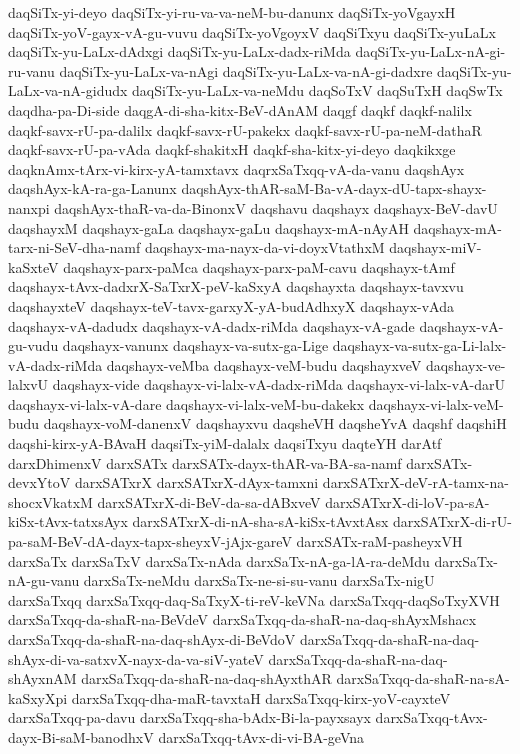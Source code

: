 {daqSiTx-yi-deyo
daqSiTx-yi-ru-va-va-neM-bu-danunx
daqSiTx-yoVgayxH
daqSiTx-yoV-gayx-vA-gu-vuvu
daqSiTx-yoVgoyxV
daqSiTxyu
daqSiTx-yuLaLx
daqSiTx-yu-LaLx-dAdxgi
daqSiTx-yu-LaLx-dadx-riMda
daqSiTx-yu-LaLx-nA-gi-ru-vanu
daqSiTx-yu-LaLx-va-nAgi
daqSiTx-yu-LaLx-va-nA-gi-dadxre
daqSiTx-yu-LaLx-va-nA-gidudx
daqSiTx-yu-LaLx-va-neMdu
daqSoTxV
daqSuTxH
daqSwTx
daqdha-pa-Di-side
daqgA-di-sha-kitx-BeV-dAnAM
daqgf
daqkf
daqkf-nalilx
daqkf-savx-rU-pa-dalilx
daqkf-savx-rU-pakekx
daqkf-savx-rU-pa-neM-dathaR
daqkf-savx-rU-pa-vAda
daqkf-shakitxH
daqkf-sha-kitx-yi-deyo
daqkikxge
daqknAmx-tArx-vi-kirx-yA-tamxtavx
daqrxSaTxqq-vA-da-vanu
daqshAyx
daqshAyx-kA-ra-ga-Lanunx
daqshAyx-thAR-saM-Ba-vA-dayx-dU-tapx-shayx-nanxpi
daqshAyx-thaR-va-da-BinonxV
daqshavu
daqshayx
daqshayx-BeV-davU
daqshayxM
daqshayx-gaLa
daqshayx-gaLu
daqshayx-mA-nAyAH
daqshayx-mA-tarx-ni-SeV-dha-namf
daqshayx-ma-nayx-da-vi-doyxVtathxM
daqshayx-miV-kaSxteV
daqshayx-parx-paMca
daqshayx-parx-paM-cavu
daqshayx-tAmf
daqshayx-tAvx-dadxrX-SaTxrX-peV-kaSxyA
daqshayxta
daqshayx-tavxvu
daqshayxteV
daqshayx-teV-tavx-garxyX-yA-budAdhxyX
daqshayx-vAda
daqshayx-vA-dadudx
daqshayx-vA-dadx-riMda
daqshayx-vA-gade
daqshayx-vA-gu-vudu
daqshayx-vanunx
daqshayx-va-sutx-ga-Lige
daqshayx-va-sutx-ga-Li-lalx-vA-dadx-riMda
daqshayx-veMba
daqshayx-veM-budu
daqshayxveV
daqshayx-ve-lalxvU
daqshayx-vide
daqshayx-vi-lalx-vA-dadx-riMda
daqshayx-vi-lalx-vA-darU
daqshayx-vi-lalx-vA-dare
daqshayx-vi-lalx-veM-bu-dakekx
daqshayx-vi-lalx-veM-budu
daqshayx-voM-danenxV
daqshayxvu
daqsheVH
daqsheYvA
daqshf
daqshiH
daqshi-kirx-yA-BAvaH
daqsiTx-yiM-dalalx
daqsiTxyu
daqteYH
darAtf
darxDhimenxV
darxSATx
darxSATx-dayx-thAR-va-BA-sa-namf
darxSATx-devxYtoV
darxSATxrX
darxSATxrX-dAyx-tamxni
darxSATxrX-deV-rA-tamx-na-shocxVkatxM
darxSATxrX-di-BeV-da-sa-dABxveV
darxSATxrX-di-loV-pa-sA-kiSx-tAvx-tatxsAyx
darxSATxrX-di-nA-sha-sA-kiSx-tAvxtAsx
darxSATxrX-di-rU-pa-saM-BeV-dA-dayx-tapx-sheyxV-jAjx-gareV
darxSATx-raM-pasheyxVH
darxSaTx
darxSaTxV
darxSaTx-nAda
darxSaTx-nA-ga-lA-ra-deMdu
darxSaTx-nA-gu-vanu
darxSaTx-neMdu
darxSaTx-ne-si-su-vanu
darxSaTx-nigU
darxSaTxqq
darxSaTxqq-daq-SaTxyX-ti-reV-keVNa
darxSaTxqq-daqSoTxyXVH
darxSaTxqq-da-shaR-na-BeVdeV
darxSaTxqq-da-shaR-na-daq-shAyxMshacx
darxSaTxqq-da-shaR-na-daq-shAyx-di-BeVdoV
darxSaTxqq-da-shaR-na-daq-shAyx-di-va-satxvX-nayx-da-va-siV-yateV
darxSaTxqq-da-shaR-na-daq-shAyxnAM
darxSaTxqq-da-shaR-na-daq-shAyxthAR
darxSaTxqq-da-shaR-na-sA-kaSxyXpi
darxSaTxqq-dha-maR-tavxtaH
darxSaTxqq-kirx-yoV-cayxteV
darxSaTxqq-pa-davu
darxSaTxqq-sha-bAdx-Bi-la-payxsayx
darxSaTxqq-tAvx-dayx-Bi-saM-banodhxV
darxSaTxqq-tAvx-di-vi-BA-geVna
}
